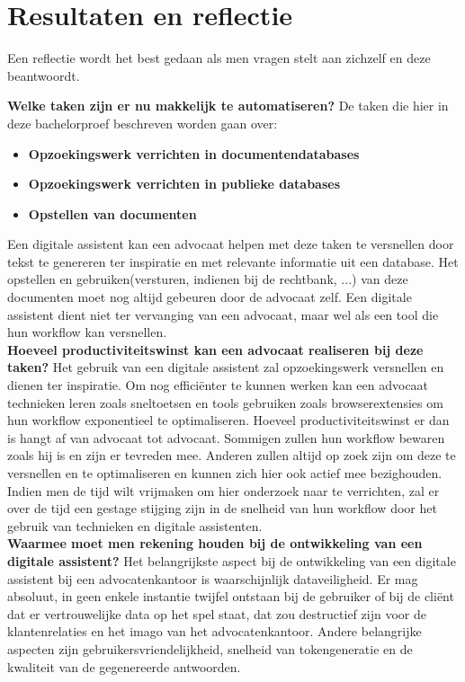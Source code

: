 \chapter{Resultaten en reflectie}
Een reflectie wordt het best gedaan als men vragen stelt aan zichzelf en deze beantwoordt. 

\textbf{Welke taken zijn er nu makkelijk te automatiseren?}
De taken die hier in deze bachelorproef beschreven worden gaan over:
\begin{itemize}
	\item \textbf{Opzoekingswerk verrichten in documentendatabases}
	\item \textbf{Opzoekingswerk verrichten in publieke databases}
	\item \textbf{Opstellen van documenten}
\end{itemize}
Een digitale assistent kan een advocaat helpen met deze taken te versnellen door tekst te genereren ter inspiratie en met relevante informatie uit een database. 
Het opstellen en gebruiken(versturen, indienen bij de rechtbank, ...) van deze documenten moet nog altijd gebeuren door de advocaat zelf. 
Een digitale assistent dient niet ter vervanging van een advocaat, maar wel als een tool die hun workflow kan versnellen. \\ 

\textbf{Hoeveel productiviteitswinst kan een advocaat realiseren bij deze taken?}
Het gebruik van een digitale assistent zal opzoekingswerk versnellen en dienen ter inspiratie. 
Om nog efficiënter te kunnen werken kan een advocaat technieken leren zoals sneltoetsen en tools gebruiken zoals browserextensies om hun workflow exponentieel te optimaliseren. 
Hoeveel productiviteitswinst er dan is hangt af van advocaat tot advocaat. 
Sommigen zullen hun workflow bewaren zoals hij is en zijn er tevreden mee. 
Anderen zullen altijd op zoek zijn om deze te versnellen en te optimaliseren en kunnen zich hier ook actief mee bezighouden. 
Indien men de tijd wilt vrijmaken om hier onderzoek naar te verrichten, zal er over de tijd een gestage stijging 
zijn in de snelheid van hun workflow door het gebruik van technieken en digitale assistenten. \\ 

\textbf{Waarmee moet men rekening houden bij de ontwikkeling van een digitale assistent?}
Het belangrijkste aspect bij de ontwikkeling van een digitale assistent bij een advocatenkantoor is waarschijnlijk dataveiligheid. 
Er mag absoluut, in geen enkele instantie twijfel ontstaan bij de gebruiker of bij de cliënt dat er vertrouwelijke data op het spel staat, 
dat zou destructief zijn voor de klantenrelaties en het imago van het advocatenkantoor. 
Andere belangrijke aspecten zijn gebruikersvriendelijkheid, snelheid van tokengeneratie en de kwaliteit van de gegenereerde antwoorden.\\ 

